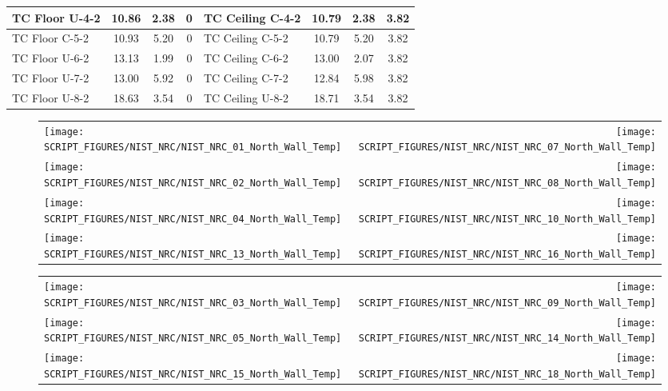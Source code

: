 \begin{table}[ht]
\begin{center}
\begin{tabular}{|l|c|c|c||l|c|c|c|}
TC Floor U-4-2    & 10.86 & 2.38 & 0        & TC Ceiling C-4-2  & 10.79 & 2.38  & 3.82      \\ \hline
TC Floor C-5-2    & 10.93 & 5.20 & 0        & TC Ceiling C-5-2  & 10.79 & 5.20  & 3.82      \\ \hline
TC Floor U-6-2    & 13.13 & 1.99 & 0        & TC Ceiling C-6-2  & 13.00 & 2.07  & 3.82      \\ \hline
TC Floor U-7-2    & 13.00 & 5.92 & 0        & TC Ceiling C-7-2  & 12.84 & 5.98  & 3.82      \\ \hline
TC Floor U-8-2    & 18.63 & 3.54 & 0        & TC Ceiling U-8-2  & 18.71 & 3.54  & 3.82      \\ \hline
\end{tabular}
\end{center}
\label{NIST_NRC_Wall_Coords}
\end{table}

\newpage

\begin{figure}[p]
\begin{tabular*}{\textwidth}{l@{\extracolsep{\fill}}r}
\texttt{[image: SCRIPT\_FIGURES/NIST\_NRC/NIST\_NRC\_01\_North\_Wall\_Temp]} &
\texttt{[image: SCRIPT\_FIGURES/NIST\_NRC/NIST\_NRC\_07\_North\_Wall\_Temp]} \\
\texttt{[image: SCRIPT\_FIGURES/NIST\_NRC/NIST\_NRC\_02\_North\_Wall\_Temp]} &
\texttt{[image: SCRIPT\_FIGURES/NIST\_NRC/NIST\_NRC\_08\_North\_Wall\_Temp]} \\
\texttt{[image: SCRIPT\_FIGURES/NIST\_NRC/NIST\_NRC\_04\_North\_Wall\_Temp]} &
\texttt{[image: SCRIPT\_FIGURES/NIST\_NRC/NIST\_NRC\_10\_North\_Wall\_Temp]} \\
\texttt{[image: SCRIPT\_FIGURES/NIST\_NRC/NIST\_NRC\_13\_North\_Wall\_Temp]} &
\texttt{[image: SCRIPT\_FIGURES/NIST\_NRC/NIST\_NRC\_16\_North\_Wall\_Temp]}
\end{tabular*}
\label{NIST_NRC_North_Wall_Temp_Closed}
\end{figure}

\begin{figure}[p]
\begin{tabular*}{\textwidth}{l@{\extracolsep{\fill}}r}
\texttt{[image: SCRIPT\_FIGURES/NIST\_NRC/NIST\_NRC\_03\_North\_Wall\_Temp]} &
\texttt{[image: SCRIPT\_FIGURES/NIST\_NRC/NIST\_NRC\_09\_North\_Wall\_Temp]} \\
\texttt{[image: SCRIPT\_FIGURES/NIST\_NRC/NIST\_NRC\_05\_North\_Wall\_Temp]} &
\texttt{[image: SCRIPT\_FIGURES/NIST\_NRC/NIST\_NRC\_14\_North\_Wall\_Temp]} \\
\texttt{[image: SCRIPT\_FIGURES/NIST\_NRC/NIST\_NRC\_15\_North\_Wall\_Temp]} &
\texttt{[image: SCRIPT\_FIGURES/NIST\_NRC/NIST\_NRC\_18\_North\_Wall\_Temp]}
\end{tabular*}
\label{NIST_NRC_North_Wall_Temp_Open}
\end{figure}

